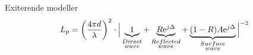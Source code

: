 \begin{frame}{Exiterende modeller}
\vspace{1em}
\begin{equation}
L_p=\left(\frac{4 \pi d}{\lambda}\right)^2 \cdot \Big|\underbrace{1}_{\begin{subarray}{c}Direct\\wave\end{subarray}}+\underbrace{R\text{e}^{j\Delta}}_{\begin{subarray}{c}Reflected\\wave\end{subarray}}+\underbrace{(1-R)A\text{e}^{j\Delta}}_{\begin{subarray}{c}Surface\\wave\end{subarray}}\Big|^{-2} 
\label{ground_wave}
\end{equation}
\end{frame}


